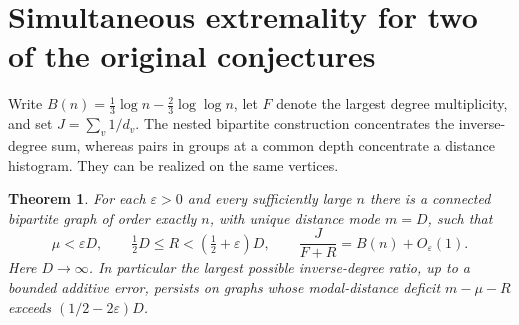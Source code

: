 \documentclass[11pt,a4paper]{article}
\newtheorem{theorem}{Theorem}[section]
\theoremstyle{remark}\newtheorem*{remark}{Remark}
\begin{document}
\section{Simultaneous extremality for two of the original conjectures}\label{sec:joint}
Write $B(n)=\tfrac13\log n-\tfrac23\log\log n$, let $F$ denote the largest degree multiplicity, and set $J=\sum_v1/d_v$. The nested bipartite construction concentrates the inverse-degree sum, whereas pairs in groups at a common depth concentrate a distance histogram. They can be realized on the same vertices.
\begin{theorem}\label{thm:joint}
For each $\varepsilon>0$ and every sufficiently large $n$ there is a connected bipartite graph of order exactly $n$, with unique distance mode $m=D$, such that
\[
 \mu<\varepsilon D,\qquad \tfrac12D\le R<(\tfrac12+\varepsilon)D,
 \qquad \frac{J}{F+R}=B(n)+O_\varepsilon(1).
\]
Here $D\to\infty$. In particular the largest possible inverse-degree ratio, up to a bounded additive error, persists on graphs whose modal-distance deficit $m-\mu-R$ exceeds $(1/2-2\varepsilon)D$.
\end{theorem}
\end{document}
